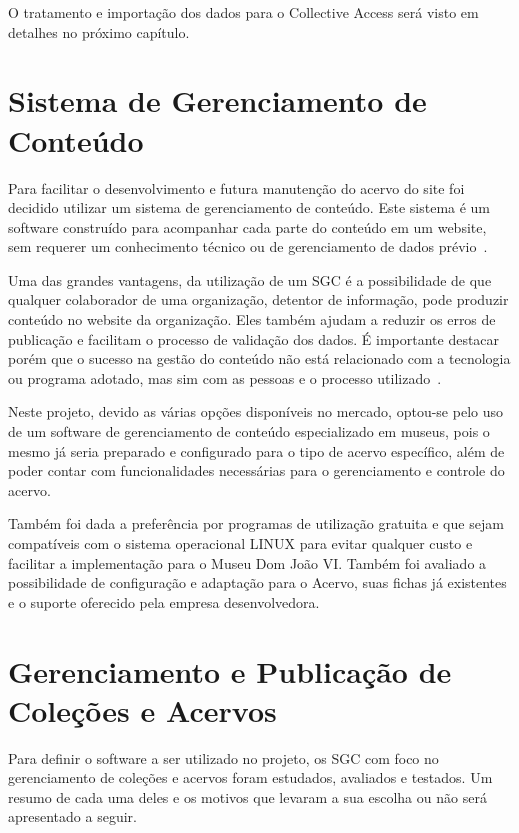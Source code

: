 \documentclass[a4paper,12pt,oneside,onecolumn,final,fleqn]{repUERJ}
\begin{document}
O tratamento e importação dos dados para o Collective Access será visto em detalhes no próximo capítulo.

\section{Sistema de Gerenciamento de Conteúdo}

Para facilitar o desenvolvimento e futura manutenção do acervo do site foi decidido utilizar um sistema de gerenciamento de conteúdo. Este sistema é um software construído para acompanhar cada parte do conteúdo em um website, sem requerer um conhecimento técnico ou de gerenciamento de dados prévio~\cite{CMS}.

Uma das grandes vantagens, da utilização de um SGC é a possibilidade de que qualquer colaborador de uma organização, detentor de informação, pode produzir conteúdo no website da organização. Eles também ajudam a reduzir os erros de publicação e facilitam o processo de validação dos dados. É importante destacar porém que o sucesso na gestão do conteúdo não está relacionado com a tecnologia ou programa adotado, mas sim com as pessoas e o processo utilizado~\cite{chagas2018estudo}.


Neste projeto, devido as várias opções disponíveis no mercado, optou-se pelo uso de um software de gerenciamento de conteúdo especializado em museus, pois o mesmo já seria preparado e configurado para o tipo de acervo específico, além de poder contar com funcionalidades necessárias para o gerenciamento e controle do acervo. 

Também foi dada a preferência por programas de utilização gratuita e que sejam compatíveis com o sistema operacional LINUX para evitar qualquer custo e facilitar a implementação para o Museu Dom João VI. Também foi avaliado a possibilidade de configuração e adaptação para o Acervo, suas fichas já existentes e o suporte oferecido pela empresa desenvolvedora.

\section{Gerenciamento e Publicação de Coleções e Acervos}

Para definir o software a ser utilizado no projeto, os SGC com foco no gerenciamento de coleções e acervos foram estudados, avaliados e testados. Um resumo de cada uma deles e os motivos que levaram a sua escolha ou não será apresentado a seguir.
\end{document}
